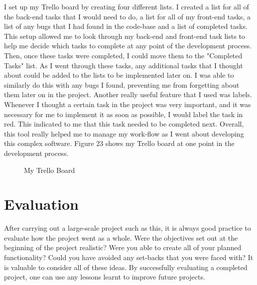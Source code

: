 I set up my Trello board by creating four different lists. I created a list for all of the back-end tasks that I would need to do, a list for all of my front-end tasks, a list of any bugs that I had found in the code-base and a list of completed tasks. This setup allowed me to look through my back-end and front-end task lists to help me decide which tasks to complete at any point of the development process. Then, once these tasks were completed, I could move them to the "Completed Tasks" list. As I went through these tasks, any additional tasks that I thought about could be added to the lists to be implemented later on. I was able to similarly do this with any bugs I found, preventing me from forgetting about them later on in the project. Another really useful feature that I used was labels. Whenever I thought a certain task in the project was very important, and it was necessary for me to implement it as soon as possible, I would label the task in red. This indicated to me that this task needed to be completed next. Overall, this tool really helped me to manage my work-flow as I went about developing this complex software. Figure 23 shows my Trello board at one point in the development process.

\begin{figure}[!ht]
	\centering
	\caption{My Trello Board}
\end{figure}

\pagebreak

\section{Evaluation}

After carrying out a large-scale project such as this, it is always good practice to evaluate how the project went as a whole. Were the objectives set out at the beginning of the project realistic? Were you able to create all of your planned functionality? Could you have avoided any set-backs that you were faced with? It is valuable to consider all of these ideas. By successfully evaluating a completed project, one can use any lessons learnt to improve future projects.

